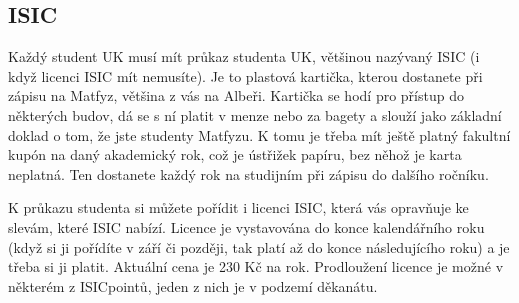 \subsection{ISIC}
Každý student UK musí mít průkaz studenta UK, většinou nazývaný ISIC (i když licenci ISIC mít nemusíte). Je to plastová kartička, kterou dostanete při zápisu na Matfyz, většina z vás na Albeři. Kartička se hodí pro přístup do některých budov, dá se s ní platit v menze nebo za bagety a slouží jako základní doklad o tom, že jste studenty Matfyzu. K tomu je třeba mít ještě platný fakultní kupón na daný akademický rok, což je ústřižek papíru, bez něhož je karta neplatná. Ten dostanete každý rok na studijním při zápisu do dalšího ročníku.

K průkazu studenta si můžete pořídit i licenci ISIC, která vás opravňuje ke slevám, které ISIC nabízí. Licence je vystavována do konce kalendářního roku (když si ji pořídíte v září či později, tak platí až do konce následujícího roku) a je třeba si ji platit. Aktuální cena je 230 Kč na rok. Prodloužení licence je možné v některém z ISICpointů, jeden z nich je v podzemí děkanátu.